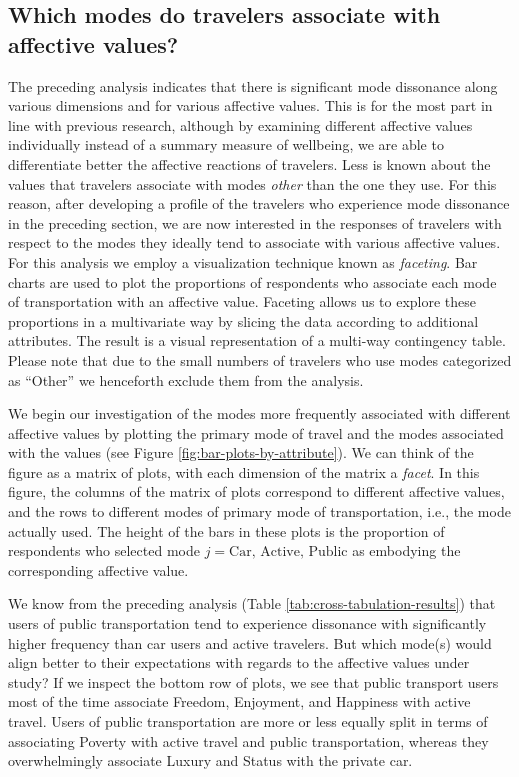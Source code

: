 \documentclass[]{elsarticle} %
\begin{document}
\hypertarget{which-modes-do-travelers-associate-with-affective-values}{%
\subsection{Which modes do travelers associate with affective
values?}\label{which-modes-do-travelers-associate-with-affective-values}}

The preceding analysis indicates that there is significant mode
dissonance along various dimensions and for various affective values.
This is for the most part in line with previous research, although by
examining different affective values individually instead of a summary
measure of wellbeing, we are able to differentiate better the affective
reactions of travelers. Less is known about the values that travelers
associate with modes \emph{other} than the one they use. For this
reason, after developing a profile of the travelers who experience mode
dissonance in the preceding section, we are now interested in the
responses of travelers with respect to the modes they ideally tend to
associate with various affective values. For this analysis we employ a
visualization technique known as \emph{faceting}. Bar charts are used to
plot the proportions of respondents who associate each mode of
transportation with an affective value. Faceting allows us to explore
these proportions in a multivariate way by slicing the data according to
additional attributes. The result is a visual representation of a
multi-way contingency table. Please note that due to the small numbers
of travelers who use modes categorized as ``Other'' we henceforth
exclude them from the analysis.

We begin our investigation of the modes more frequently associated with
different affective values by plotting the primary mode of travel and
the modes associated with the values (see Figure
\ref{fig:bar-plots-by-attribute}). We can think of the figure as a
matrix of plots, with each dimension of the matrix a \emph{facet}. In
this figure, the columns of the matrix of plots correspond to different
affective values, and the rows to different modes of primary mode of
transportation, i.e., the mode actually used. The height of the bars in
these plots is the proportion of respondents who selected mode
\(j = \text{Car, Active, Public}\) as embodying the corresponding
affective value.

We know from the preceding analysis (Table
\ref{tab:cross-tabulation-results}) that users of public transportation
tend to experience dissonance with significantly higher frequency than
car users and active travelers. But which mode(s) would align better to
their expectations with regards to the affective values under study? If
we inspect the bottom row of plots, we see that public transport users
most of the time associate Freedom, Enjoyment, and Happiness with active
travel. Users of public transportation are more or less equally split in
terms of associating Poverty with active travel and public
transportation, whereas they overwhelmingly associate Luxury and Status
with the private car.
\end{document}
